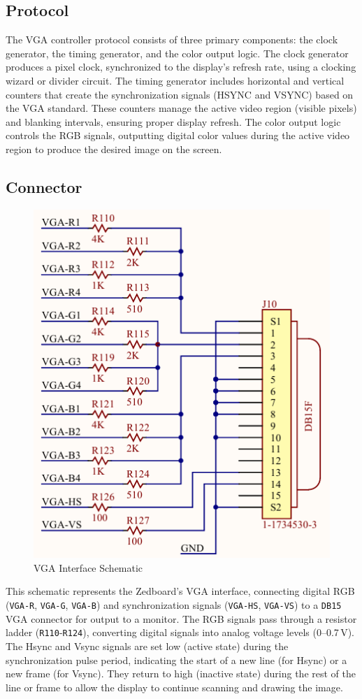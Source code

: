 \documentclass{article}
\begin{document}
\subsection{Protocol}
\label{subsec:VGA Protocol}

The VGA controller protocol consists of three primary components: the clock generator, the timing generator, and the color output logic. The clock generator produces a pixel clock, synchronized to the display's refresh rate, using a clocking wizard or divider circuit. The timing generator includes horizontal and vertical counters that create the synchronization signals (HSYNC and VSYNC) based on the VGA standard. These counters manage the active video region (visible pixels) and blanking intervals, ensuring proper display refresh. The color output logic controls the RGB signals, outputting digital color values during the active video region to produce the desired image on the screen.

\subsection{Connector}

\begin{figure}[hb]
    \centering
    \includegraphics[width=0.5\linewidth]{VGA Interface Schematic.png}
    \caption{VGA Interface Schematic\cite{noauthor_zedboard_nodate} }
    \label{fig:VGA Sch}
\end{figure}

This schematic represents the Zedboard's VGA interface, connecting digital RGB (\verb|VGA-R|, \verb|VGA-G|, \verb|VGA-B|) and synchronization signals (\verb|VGA-HS|, \verb|VGA-VS|) to a \verb|DB15| VGA connector for output to a monitor. The RGB signals pass through a resistor ladder (\verb|R110|-\verb|R124|), converting digital signals into analog voltage levels (0–0.7\,V). The Hsync and Vsync signals are set low (active state) during the synchronization pulse period, indicating the start of a new line (for Hsync) or a new frame (for Vsync). They return to high (inactive state) during the rest of the line or frame to allow the display to continue scanning and drawing the image.
\end{document}
